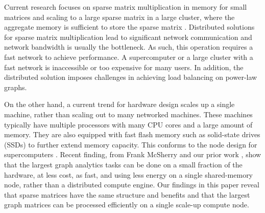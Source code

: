 %




Current research focuses on sparse matrix multiplication in memory
for small matrices and scaling to a large sparse matrix in a large cluster,
where the aggregate memory is sufficient to store the sparse matrix
\cite{Williams07, Yoo11, Boman2013}.
Distributed solutions for sparse matrix multiplication lead to significant
network communication and network bandwidth is usually the bottleneck.
As such, this operation requires a fast network to achieve performance.
A supercomputer or a large cluster with a fast network is inaccessible or
too expensive for many users. In addition, the distributed solution imposes
challenges in achieving load balancing on power-law graphs.

On the other hand, a current trend for hardware design scales up
a single machine, rather than scaling out to 
many networked machines.
These machines typically have multiple processors with many CPU cores and
a large amount of memory. They are also equipped with fast flash
memory such as solid-state drives (SSDs) to further extend memory capacity.
This conforms to the node design for supercomputers \cite{Ang14}.
Recent finding, from Frank McSherry \cite{McSherry15,McSherryBlog} and our
prior work \cite{FlashGraph},
show that the largest graph analytics tasks can be done on a small fraction of
the hardware, at less cost, as fast, and using less energy on a single shared-memory 
node, rather than a distributed compute engine.  Our findings in this paper reveal
that sparse matrices have the same structure and benefits and that the largest graph
matrices can be processed efficiently on a single scale-up compute node.

